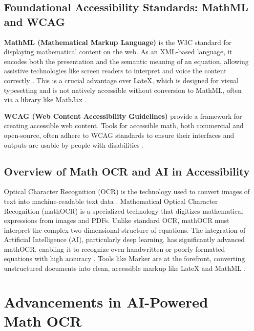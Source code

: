 \subsection{Foundational Accessibility Standards: MathML and WCAG}\label{ch11:ssec:standards}
\textbf{\gls{MathML} (Mathematical Markup Language)} is the W3C standard for displaying mathematical content on the web. As an \gls{XML}-based language, it encodes both the presentation and the semantic meaning of an equation, allowing assistive technologies like screen readers to interpret and voice the content correctly \supercite{W3CMathML}. This is a crucial advantage over \gls{LateX}, which is designed for visual typesetting and is not natively accessible without conversion to \gls{MathML}, often via a library like MathJax \supercite{MathJax}.

\textbf{\gls{WCAG} (Web Content Accessibility Guidelines)} provide a framework for creating accessible web content. Tools for accessible math, both commercial and open-source, often adhere to \gls{WCAG} standards to ensure their interfaces and outputs are usable by people with disabilities \supercite{WCAG20}.

\subsection{Overview of Math OCR and AI in Accessibility}\label{ch11:ssec:math-ocr-ai}
Optical Character Recognition (OCR) is the technology used to convert images of text into machine-readable text data \supercite{AdobeOCR}. Mathematical Optical Character Recognition (\gls{mathOCR}) is a specialized technology that digitizes mathematical expressions from images and PDFs. Unlike standard \gls{OCR}, \gls{mathOCR} must interpret the complex two-dimensional structure of equations. The integration of Artificial Intelligence (\gls{AI}), particularly deep learning, has significantly advanced \gls{mathOCR}, enabling it to recognize even handwritten or poorly formatted equations with high accuracy \supercite{AIinOCR}. Tools like Marker are at the forefront, converting unstructured documents into clean, accessible markup like \gls{LateX} and \gls{MathML} \supercite{Marker}.

\section{Advancements in AI-Powered Math OCR}\label{ch11:sec:ai-ocr-advancements}
